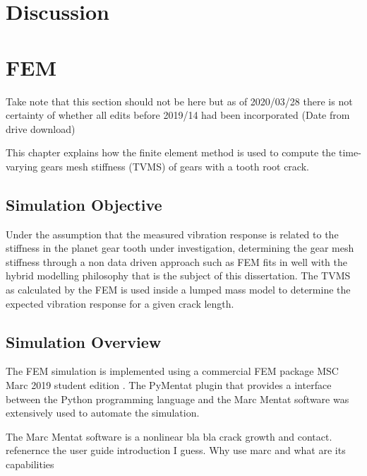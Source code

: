 
\chapter{Discussion}

\chapter{FEM}
Take note that this section should not be here but as of 2020/03/28 there is not certainty of whether all edits before 2019/14 had been incorporated (Date from drive download)

This chapter explains how the finite element method is used to compute the time-varying gears mesh stiffness (TVMS) of gears with a tooth root crack. 




\section{Simulation Objective}
Under the assumption that the measured vibration response is related to the stiffness in the planet gear tooth under investigation, determining the gear mesh stiffness through a non data driven approach such as FEM fits in well with the hybrid modelling philosophy that is the subject of this dissertation. The TVMS as calculated by the FEM is used inside a lumped mass model to determine the expected vibration response for a given crack length. 

\section{Simulation Overview}
The FEM simulation is implemented using a commercial FEM package MSC Marc 2019 student edition \cite{MSCMarc2019}. The PyMentat plugin \cite{Marc_Py2003} that provides a interface between the Python programming language and the Marc Mentat software was extensively used to automate the simulation. 

The Marc Mentat software  is a nonlinear bla bla crack growth and contact. refenernce the user guide introduction I guess. Why use marc and what are its capabilities
	

